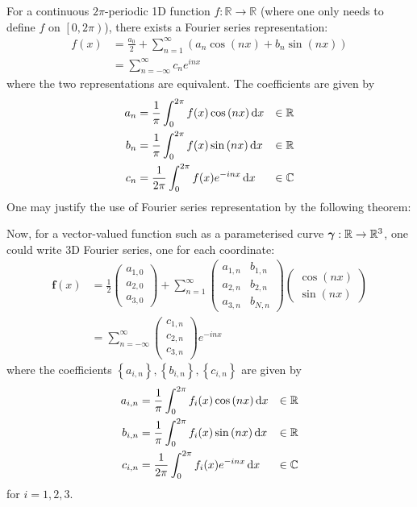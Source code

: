 \documentclass[../dissertation.tex]{subfiles}
\begin{document}
For a continuous $2\pi$-periodic 1D function $f:\mathbb{R} \rightarrow \mathbb{R}$
(where one only needs to define $f$ on $\left[ 0,2\pi \right)$),
there exists a Fourier series representation:
\begin{align}
    f(x) &= \frac{a_0}{2} + \sum_{n=1}^{\infty} \left( a_n \cos {(nx)} + b_n \sin {(nx)} \right) \\
    &= \sum_{n=-\infty}^{\infty} c_n e^{inx}
\end{align}
where the two representations are equivalent.
The coefficients are given by
\begin{align}
    a_n &= \frac{1}{\pi} \int_{0}^{2\pi} f(x) \cos {\left( nx \right)} \, \text{d} x &\in \mathbb{R}\\
    b_n &= \frac{1}{\pi} \int_{0}^{2\pi} f(x) \sin {\left( nx \right)} \, \text{d} x &\in \mathbb{R} \\
    c_n &= \frac{1}{2 \pi} \int_{0}^{2\pi} f(x) e^{-inx} \, \text{d} x &\in \mathbb{C}
\end{align}
One may justify the use of Fourier series representation by the following theorem:
\begin{theorem}
\lipsum[1]
\end{theorem}

Now, for a vector-valued function such as a parameterised curve $\boldsymbol{\gamma}:\mathbb{R} \rightarrow \mathbb{R}^3$, one could write 3D Fourier series,
one for each coordinate:
\begin{align}
    \mathbf{f} (x) &= \frac{1}{2}
    \begin{pmatrix}
        a_{1,0} \\
        a_{2,0} \\
        a_{3,0}
    \end{pmatrix}
    + \sum_{n=1}^\infty
    \begin{pmatrix}
        a_{1,n} & b_{1,n} \\
        a_{2,n} & b_{2,n} \\
        a_{3,n} & b_{N,n}
    \end{pmatrix}
    \begin{pmatrix}
        \cos {\left( nx \right)} \\
        \sin {\left( nx \right)}
    \end{pmatrix}
    \\
    &= \sum_{n=-\infty}^{\infty}
    \begin{pmatrix}
        c_{1,n} \\
        c_{2,n} \\
        c_{3,n}
    \end{pmatrix}
    e^{-inx}
\end{align}
where the coefficients $\left\{ a_{i,n} \right\}, \left\{ b_{i,n} \right\}, \left\{ c_{i,n} \right\}$ are given by
\begin{align}
    a_{i,n} &= \frac{1}{\pi} \int_{0}^{2\pi} f_i (x) \cos {\left( nx \right)} \, \text{d} x & \in \mathbb{R}\\
    b_{i,n} &= \frac{1}{\pi} \int_{0}^{2\pi} f_i (x) \sin {\left( nx \right)} \, \text{d} x & \in \mathbb{R}\\
    c_{i,n} &= \frac{1}{2\pi} \int_{0}^{2\pi} f_i (x) e^{-inx} \, \text{d} x & \in \mathbb{C}
\end{align}
for $i=1, 2, 3$.
\end{document}
